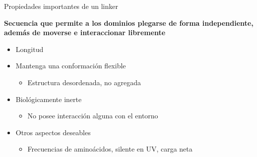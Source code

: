 \documentclass{beamer}
\begin{document}


\begin{frame}{Propiedades importantes de un linker}
\vspace{-20px}
\begin{adjustwidth}{-0.5em}{-1.5em}
\textbf{Secuencia que permite a los dominios plegarse de forma independiente, además de moverse e interaccionar libremente}
\end{adjustwidth}

 \vspace{10px}

\begin{itemize}
  \item Longitud
  \item Mantenga una conformación flexible  %
    \begin{itemize}
     \item Estructura desordenada, no agregada
    \end{itemize}

  \item Biológicamente inerte  %
    \begin{itemize}
     \item No posee interacción alguna con el entorno
    \end{itemize}

  \item Otros aspectos deseables  %
    \begin{itemize}
     \item Frecuencias de aminoácidos, silente en UV, carga neta
\end{itemize}
\end{itemize}
\end{frame}









\end{document}
